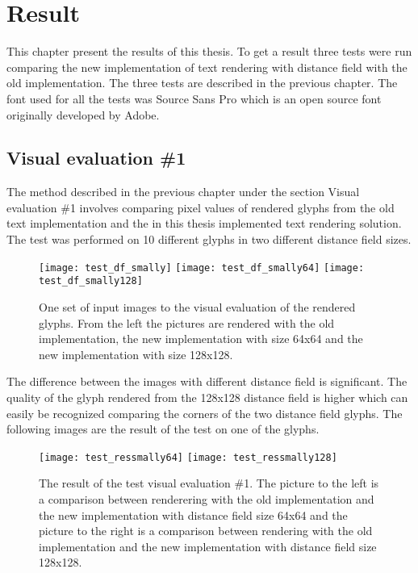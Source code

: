 \chapter{Result}\label{cha:Research}
This chapter present the results of this thesis. To get a result three tests were run comparing the new implementation of text rendering with distance field with the old implementation. The three tests are described in the previous chapter. The font used for all the tests was Source Sans Pro which is an open source font originally developed by Adobe.
\section{Visual evaluation \#1}\label{sec:research:history}
The method described in the previous chapter under the section Visual evaluation \#1 involves comparing pixel values of rendered glyphs from the old text implementation and the in this thesis implemented text rendering solution. The test was performed on 10 different glyphs in two different distance field sizes.

\begin{figure}[H]
  \texttt{[image: test\_df\_smally]}
\endminipage\hfill
{}
  \texttt{[image: test\_df\_smally64]}
\endminipage\hfill
{}
  \texttt{[image: test\_df\_smally128]}
\endminipage\hfill
\caption{One set of input images to the visual evaluation of the rendered glyphs. From the left the pictures are rendered with the old implementation, the new implementation with size 64x64 and the new implementation with size 128x128.}\label{fig:awesome_image2}
\end{figure}

The difference between the images with different distance field is significant. The quality of the glyph rendered from the 128x128 distance field is higher which can easily be recognized comparing the corners of the two distance field glyphs. The following images are the result of the test on one of the glyphs. 

\begin{figure}[H]
  \texttt{[image: test\_ressmally64]}
\endminipage\hfill
{}
  \texttt{[image: test\_ressmally128]}
\endminipage\hfill
\caption{The result of the test visual evaluation \#1. The picture to the left is a comparison between renderering with the old implementation and the new implementation with distance field size 64x64 and the picture to the right is a comparison between rendering with the old implementation and the new implementation with distance field size 128x128.}\label{fig:awesome_image2}
\end{figure}

